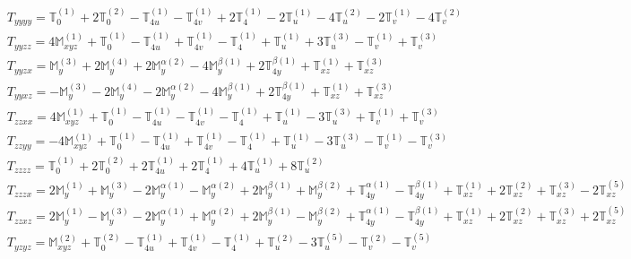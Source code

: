 \documentclass[fleqn,8pt,landscape]{jsarticle}
\begin{document}
\begin{align*}
& T_{yyyy} = \mathbb{T}_{0}^{(1)} + 2 \mathbb{T}_{0}^{(2)} - \mathbb{T}_{4u}^{(1)} - \mathbb{T}_{4v}^{(1)} + 2 \mathbb{T}_{4}^{(1)} - 2 \mathbb{T}_{u}^{(1)} - 4 \mathbb{T}_{u}^{(2)} - 2 \mathbb{T}_{v}^{(1)} - 4 \mathbb{T}_{v}^{(2)} \\
& T_{yyzz} = 4 \mathbb{M}_{xyz}^{(1)} + \mathbb{T}_{0}^{(1)} - \mathbb{T}_{4u}^{(1)} + \mathbb{T}_{4v}^{(1)} - \mathbb{T}_{4}^{(1)} + \mathbb{T}_{u}^{(1)} + 3 \mathbb{T}_{u}^{(3)} - \mathbb{T}_{v}^{(1)} + \mathbb{T}_{v}^{(3)} \\
& T_{yyzx} = \mathbb{M}_{y}^{(3)} + 2 \mathbb{M}_{y}^{(4)} + 2 \mathbb{M}_{y}^{\alpha(2)} - 4 \mathbb{M}_{y}^{\beta(1)} + 2 \mathbb{T}_{4y}^{\beta(1)} + \mathbb{T}_{xz}^{(1)} + \mathbb{T}_{xz}^{(3)} \\
& T_{yyxz} = - \mathbb{M}_{y}^{(3)} - 2 \mathbb{M}_{y}^{(4)} - 2 \mathbb{M}_{y}^{\alpha(2)} - 4 \mathbb{M}_{y}^{\beta(1)} + 2 \mathbb{T}_{4y}^{\beta(1)} + \mathbb{T}_{xz}^{(1)} + \mathbb{T}_{xz}^{(3)} \\
& T_{zzxx} = 4 \mathbb{M}_{xyz}^{(1)} + \mathbb{T}_{0}^{(1)} - \mathbb{T}_{4u}^{(1)} - \mathbb{T}_{4v}^{(1)} - \mathbb{T}_{4}^{(1)} + \mathbb{T}_{u}^{(1)} - 3 \mathbb{T}_{u}^{(3)} + \mathbb{T}_{v}^{(1)} + \mathbb{T}_{v}^{(3)} \\
& T_{zzyy} = - 4 \mathbb{M}_{xyz}^{(1)} + \mathbb{T}_{0}^{(1)} - \mathbb{T}_{4u}^{(1)} + \mathbb{T}_{4v}^{(1)} - \mathbb{T}_{4}^{(1)} + \mathbb{T}_{u}^{(1)} - 3 \mathbb{T}_{u}^{(3)} - \mathbb{T}_{v}^{(1)} - \mathbb{T}_{v}^{(3)} \\
& T_{zzzz} = \mathbb{T}_{0}^{(1)} + 2 \mathbb{T}_{0}^{(2)} + 2 \mathbb{T}_{4u}^{(1)} + 2 \mathbb{T}_{4}^{(1)} + 4 \mathbb{T}_{u}^{(1)} + 8 \mathbb{T}_{u}^{(2)} \\
& T_{zzzx} = 2 \mathbb{M}_{y}^{(1)} + \mathbb{M}_{y}^{(3)} - 2 \mathbb{M}_{y}^{\alpha(1)} - \mathbb{M}_{y}^{\alpha(2)} + 2 \mathbb{M}_{y}^{\beta(1)} + \mathbb{M}_{y}^{\beta(2)} + \mathbb{T}_{4y}^{\alpha(1)} - \mathbb{T}_{4y}^{\beta(1)} + \mathbb{T}_{xz}^{(1)} + 2 \mathbb{T}_{xz}^{(2)} + \mathbb{T}_{xz}^{(3)} - 2 \mathbb{T}_{xz}^{(5)} \\
& T_{zzxz} = 2 \mathbb{M}_{y}^{(1)} - \mathbb{M}_{y}^{(3)} - 2 \mathbb{M}_{y}^{\alpha(1)} + \mathbb{M}_{y}^{\alpha(2)} + 2 \mathbb{M}_{y}^{\beta(1)} - \mathbb{M}_{y}^{\beta(2)} + \mathbb{T}_{4y}^{\alpha(1)} - \mathbb{T}_{4y}^{\beta(1)} + \mathbb{T}_{xz}^{(1)} + 2 \mathbb{T}_{xz}^{(2)} + \mathbb{T}_{xz}^{(3)} + 2 \mathbb{T}_{xz}^{(5)} \\
& T_{yzyz} = \mathbb{M}_{xyz}^{(2)} + \mathbb{T}_{0}^{(2)} - \mathbb{T}_{4u}^{(1)} + \mathbb{T}_{4v}^{(1)} - \mathbb{T}_{4}^{(1)} + \mathbb{T}_{u}^{(2)} - 3 \mathbb{T}_{u}^{(5)} - \mathbb{T}_{v}^{(2)} - \mathbb{T}_{v}^{(5)} \\

\end{align*}
\end{document}
